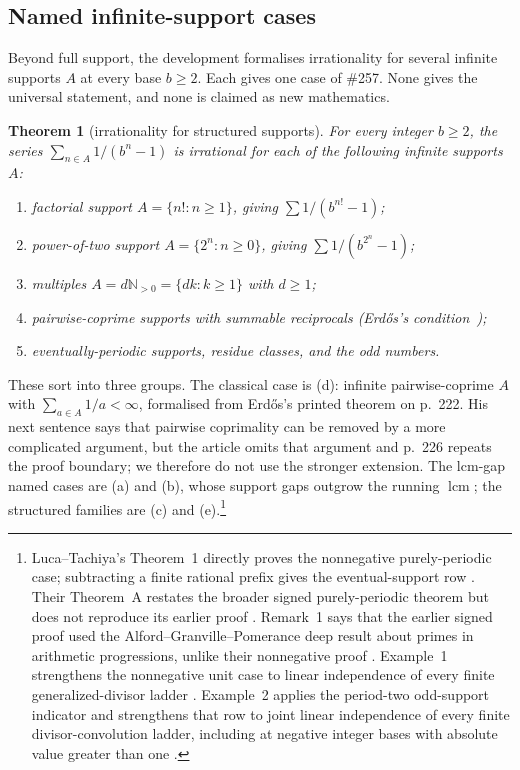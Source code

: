 \documentclass[11pt]{article}
\newtheorem{theorem}{Theorem}[section]
\theoremstyle{definition}
\theoremstyle{remark}
\newcommand{\Npos}{\mathbb{N}_{>0}}
\newcommand{\lcm}{\operatorname{lcm}}
\begin{document}
\subsection{Named infinite-support cases}

Beyond full support, the development formalises irrationality for several
infinite supports $A$ at every base $b\ge2$.  Each gives one case of \#257.
None gives the universal statement, and none is claimed as new mathematics.

\begin{theorem}[irrationality for structured supports]\label{res:support}
For every integer $b\ge2$, the series $\sum_{n\in A} 1/(b^n-1)$ is irrational for
each of the following infinite supports $A$:
\begin{enumerate}[label=\textup{(\alph*)},leftmargin=2em]
\item factorial support $A=\{n! : n\ge1\}$, giving $\sum 1/(b^{n!}-1)$;
\item power-of-two support $A=\{2^n : n\ge0\}$, giving $\sum 1/(b^{2^n}-1)$;
\item multiples $A=d\Npos=\{dk:k\ge1\}$ with $d\ge1$;
\item pairwise-coprime supports with summable reciprocals (Erd\H{o}s's
condition~\cite[Theorem, p.~222]{erdos1968});
\item eventually-periodic supports, residue classes, and the odd numbers.
\end{enumerate}
\end{theorem}
\noindent These sort into three groups. The classical case is (d): infinite
pairwise-coprime $A$ with $\sum_{a\in A}1/a<\infty$, formalised from Erd\H{o}s's
printed theorem on p.~222.  His next sentence says that pairwise coprimality
can be removed by a more complicated argument, but the article omits that
argument and p.~226 repeats the proof boundary; we therefore do not use the
stronger extension. The lcm-gap named cases are (a) and (b), whose support gaps outgrow the
running $\lcm$; the structured families are (c) and (e).\footnote{Luca--Tachiya's
Theorem~1 directly proves the nonnegative purely-periodic case; subtracting a
finite rational prefix gives the eventual-support row
\cite[Theorem~1, p.~139; proof pp.~149--150]{lucatachiya2017}.  Their
Theorem~A restates the broader signed purely-periodic theorem but does not
reproduce its earlier proof \cite[Theorem~A, p.~139]{lucatachiya2017}.
Remark~1 says that the earlier signed proof used the
Alford--Granville--Pomerance deep result about primes in arithmetic
progressions, unlike their nonnegative proof
\cite[p.~140]{lucatachiya2017}.  Example~1 strengthens the nonnegative
unit case to linear independence of every finite generalized-divisor ladder
\cite[p.~140]{lucatachiya2017}.  Example~2 applies the period-two odd-support
indicator and strengthens that row to joint linear independence of every
finite divisor-convolution ladder, including at negative integer bases with
absolute value greater than one \cite[p.~140]{lucatachiya2017}.}
\end{document}
